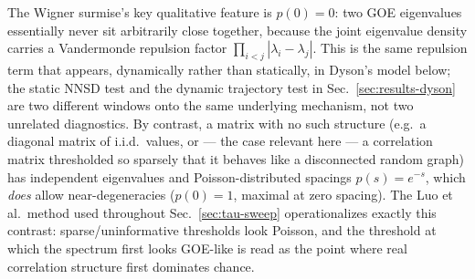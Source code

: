\documentclass[11pt]{article}
\begin{document}
The Wigner surmise's key qualitative feature is $p(0)=0$: two GOE
eigenvalues essentially never sit arbitrarily close together, because
the joint eigenvalue density carries a Vandermonde repulsion factor
$\prod_{i<j}|\lambda_i-\lambda_j|$. This is the same repulsion term that
appears, dynamically rather than statically, in Dyson's model below;
the static NNSD test and the dynamic trajectory test in
Sec.~\ref{sec:results-dyson} are two different windows onto the same
underlying mechanism, not two unrelated diagnostics. By contrast, a
matrix with no such structure (e.g.\ a diagonal matrix of i.i.d.\
values, or --- the case relevant here --- a correlation matrix
thresholded so sparsely that it behaves like a disconnected random
graph) has independent eigenvalues and Poisson-distributed spacings
$p(s)=e^{-s}$, which \emph{does} allow near-degeneracies
($p(0)=1$, maximal at zero spacing). The Luo et al.\ method
\citep{luo2007} used throughout Sec.~\ref{sec:tau-sweep} operationalizes
exactly this contrast: sparse/uninformative thresholds look Poisson,
and the threshold at which the spectrum first looks GOE-like is read as
the point where real correlation structure first dominates chance.
\end{document}
